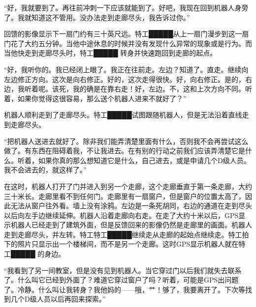 “好，我就要到了。再往前冲刺一下应该就能到了。好吧，我现在回到机器人身旁了。我就知道这不管用。没办法走到走廊尽头，我告诉过你。”

回馈的影像显示下一扇门约有三十英尺远。特工█████从上一扇门漫步到这一扇门花了大约五分钟。当他中途休息的时候并没有发现什么异常的现象或是行为。而当他快走到走廊尽头时，特工█████ 转身并快速跑回到走廊的起点。

“好，我听你的。我已经闭上眼了。我正在往前走。左边？知道了。直走。继续向左边修正方向。这次是向右修正。好的，这次走得很快。好，向右修正。是的，右边，我听着呢。该死，我的确是在靠右走！好，左边。不，这和上次方向不同。听着，如果你觉得这很容易，那么送个机器人进来不就好了？”

机器人顺利走到了走廊尽头。特工█████试图跟随机器人，但是无法沿着直线走到走廊尽头。

“把机器人送进去就好了。除非我们能弄清楚里面有什么，否则我不会再尝试这么做了。有东西在阻碍着我，不让我进去。在有别的行动之前我们应该弄清楚它是什么。听着，如果你真的那么想知道它是什么，自己进去，或是申请几个D级人员。我不会进去的，就这样了。”

在这时，机器人打开了门并进入到另一个走廊，这个走廊垂直于第一条走廊，大约三十米长。走廊里看不到任何门。走廊里有一扇窗户，但是窗户的位置太高了，因此无法从窗户往外看。墙上没有涂鸦。左边是一条死胡同，右边的通道在走到尽头以后向左手边继续延伸。机器人沿着走廊向右走。在走了大约十米以后，GPS显示机器人已经走到了建筑外面，但是反馈回来的影像仍然是走廊里的画面。机器人走到走廊尽头，并左转。特工特工█████继续走从走廊的起始点继续走。特工拍下的照片只显示出一个楼梯间，而不是另一个走廊。这时GPS显示机器人就在特工█████ 的身边。

“我看到了另一间教室，但是没有见到机器人。当它穿过门以后我们就失去联系了。什么叫它已经到外面了？难道它穿过窗户了吗？听着，可能是GPS出问题了。冷静。什么叫让我转身？我他妈的——哦，艹！够了，我要离开了。下次等找到几个D级人员以后再回来探索。”
